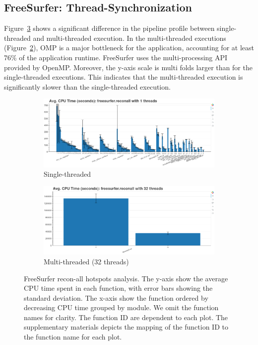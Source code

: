 \documentclass[conference]{IEEEtran}
\begin{document}
\subsection{FreeSurfer: Thread-Synchronization}
Figure~\ref{fig:hotspots-freesurfer-reconall} shows a significant difference in the pipeline profile between single-threaded and multi-threaded execution. In the multi-threaded executions (Figure~\ref{subfig:hotspots-freesurfer-reconall-32threads}), OMP is a major bottleneck for the application, accounting for at least 76\% of the application runtime. FreeSurfer uses the multi-processing API provided by OpenMP. Moreover, the y-axis scale is multi folds larger than for the single-threaded executions. This indicates that the multi-threaded execution is significantly slower than the single-threaded execution.
					
\begin{figure}
	\centering
	\begin{subfigure}[t]{0.49\textwidth}
		\caption{Single-threaded}
		\label{subfig:hotspots-freesurfer-reconall-1thread}
		\includegraphics[width=\textwidth]{figures/hotspots-1threads-freesurfer-reconall-simple.png}
	\end{subfigure}
	\begin{subfigure}[t]{0.49\textwidth}
		\caption{Multi-threaded (32 threads)}
		\label{subfig:hotspots-freesurfer-reconall-32threads}
		\includegraphics[width=\textwidth]{figures/hotspots-32threads-freesurfer-reconall-simple.png}
	\end{subfigure}
	\caption{FreeSurfer recon-all hotspots analysis. The y-axis show the average CPU time spent in each function, with error bars showing the standard deviation. The x-axis show the function ordered by decreasing CPU time grouped by module. We omit the function names for clarity. The function ID are dependent to each plot. The supplementary materials depicts the mapping of the function ID to the function name for each plot.}
	\label{fig:hotspots-freesurfer-reconall}
\end{figure}
			
\end{document}

